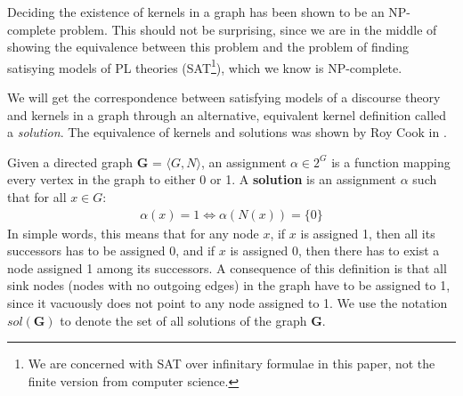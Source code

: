 Deciding the existence of kernels in a graph has been shown to be an NP-complete\cite{chvatal} problem.
This should not be surprising, since we are in the middle of showing the equivalence between this problem and the problem of finding satisying models of PL theories (SAT\footnote{We are concerned with SAT over infinitary formulae in this paper, not the finite version from computer science.}), which we know is NP-complete.

We will get the correspondence between satisfying models of a discourse theory and kernels in a graph through an alternative, equivalent kernel definition called a \textit{solution}.
The equivalence of kernels and solutions was shown by Roy Cook in \cite{cook}.

Given a directed graph \textbf{G} = $\langle G,N \rangle$, an assignment $\alpha \in 2^G$ is a function mapping every vertex in the graph to either 0 or 1.
A \textbf{solution} is an assignment $\alpha$ such that for all $x \in G:$
\begin{align}
  \alpha(x) = 1 \iff \alpha(N(x)) = \{ 0 \}
\end{align}
In simple words, this means that for any node $x$, if $x$ is assigned 1, then all its successors has to be assigned  0, and if $x$ is assigned 0, then there has to exist a node assigned 1 among its successors.
A consequence of this definition is that all sink nodes (nodes with no outgoing edges) in the graph have to be assigned to 1, since it vacuously does not point to any node assigned to 1.
We use the notation $sol(\mathbf{G})$ to denote the set of all solutions of the graph \textbf{G}.
